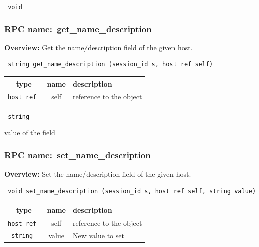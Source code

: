 \vspace{0.3cm}

{\tt 
void
}



\vspace{0.3cm}
\vspace{0.3cm}
\vspace{0.3cm}
\subsubsection{RPC name:~get\_name\_description}

{\bf Overview:} 
Get the name/description field of the given host.

\begin{verbatim} string get_name_description (session_id s, host ref self)\end{verbatim}



 
\vspace{0.3cm}
\begin{tabular}{|c|c|p{7cm}|}
 \hline
{\bf type} & {\bf name} & {\bf description} \\ \hline
{\tt host ref } & self & reference to the object \\ \hline 

\end{tabular}

\vspace{0.3cm}

{\tt 
string
}


value of the field
\vspace{0.3cm}
\vspace{0.3cm}
\vspace{0.3cm}
\subsubsection{RPC name:~set\_name\_description}

{\bf Overview:} 
Set the name/description field of the given host.

\begin{verbatim} void set_name_description (session_id s, host ref self, string value)\end{verbatim}



 
\vspace{0.3cm}
\begin{tabular}{|c|c|p{7cm}|}
 \hline
{\bf type} & {\bf name} & {\bf description} \\ \hline
{\tt host ref } & self & reference to the object \\ \hline 

{\tt string } & value & New value to set \\ \hline 

\end{tabular}

